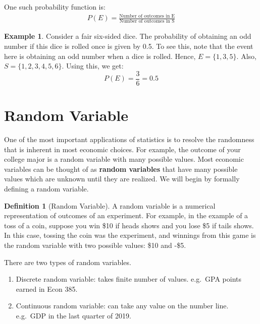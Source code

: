 \documentclass[
]{book}
\theoremstyle{definition}
\newtheorem{definition}{Definition}[chapter]
\theoremstyle{definition}
\newtheorem{example}{Example}[chapter]
\theoremstyle{definition}
\theoremstyle{definition}
\theoremstyle{remark}
\begin{document}
One such probability function is:
\begin{align}
P(E) = \frac{\text{Number of  outcomes  in  E}}{\text{Number  of  outcomes  in  S}}
\end{align}

\begin{example}
\protect\hypertarget{exm:unnamed-chunk-25}{}\label{exm:unnamed-chunk-25}Consider a fair six-sided dice. The probability of obtaining an odd number if this dice is rolled once is given by 0.5. To see this, note that the event here is obtaining an odd number when a dice is rolled. Hence, \(E=\{1,3,5\}\). Also, \(S=\{1,2,3,4,5,6\}\). Using this, we get:
\begin{equation}
P(E)=\frac{3}{6}=0.5
\end{equation}
\end{example}

\hypertarget{random-variable}{%
\section{Random Variable}\label{random-variable}}

One of the most important applications of statistics is to resolve the randomness that is inherent in most economic choices. For example, the outcome of your college major is a random variable with many possible values. Most economic variables can be thought of as \textbf{random variables} that have many possible values which are unknown until they are realized. We will begin by formally defining a random variable.

\begin{definition}[Random Variable]
\protect\hypertarget{def:unnamed-chunk-26}{}\label{def:unnamed-chunk-26}A random variable is a numerical representation of outcomes of an experiment. For example, in the example of a toss of a coin, suppose you win \$10 if heads shows and you lose \$5 if tails shows. In this case, tossing the coin was the experiment, and winnings from this game is the random variable with two possible values: \$10 and -\$5.
\end{definition}

There are two types of random variables.

\begin{enumerate}
\def\labelenumi{\arabic{enumi}.}
\item
  Discrete random variable: takes finite number of values. e.g.~GPA points earned in Econ 385.
\item
  Continuous random variable: can take any value on the number line. e.g.~GDP in the last quarter of 2019.
\end{enumerate}
\end{document}
